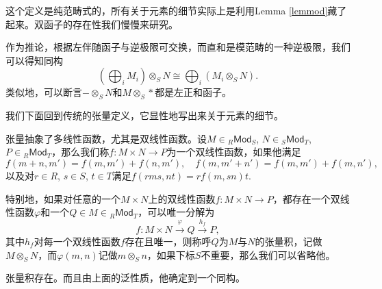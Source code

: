 这个定义是纯范畴式的，所有关于元素的细节实际上是利用Lemma \ref{lemmod}藏了起来。双函子的存在性我们慢慢来研究。


作为推论，根据左伴随函子与逆极限可交换，而直和是模范畴的一种逆极限，我们可以得知同构
\[
	\left(\bigoplus_i M_i\right)\otimes_S N\cong \bigoplus_i \left(M_i\otimes_S N\right).
\]
类似地，可以断言$-\otimes_S N$和$M\otimes_S *$都是左正和函子。

我们下面回到传统的张量定义，它显性地写出来关于元素的细节。

\para 张量抽象了多线性函数，尤其是双线性函数。设$M\in {}_R\mathsf{Mod}_S$, $N\in {}_S\mathsf{Mod}_T$, $P\in {}_R\mathsf{Mod}_T$，那么我们称$f:M\times N\to P$为一个双线性函数，如果他满足
\[
	f(m+n,m')=f(m,m')+f(n,m'),\quad f(m,m'+n')=f(m,m')+f(m,n'),
\]
以及对$r\in R$, $s\in S$, $t\in T$满足$f(rms,nt)=rf(m,sn)t$. 

特别地，如果对任意的一个$M\times N$上的双线性函数$f:M\times N\to P$，都存在一个双线性函数$\varphi$和一个$Q\in M\in {}_R\mathsf{Mod}_T$，可以唯一分解为
\[
	f:M\times N\xrightarrow{\varphi} Q\xrightarrow{h_f}P,
\]
其中$h_f$对每一个双线性函数$f$存在且唯一，则称呼$Q$为$M$与$N$的张量积，记做$M\otimes_S N$，而$\varphi(m,n)$记做$m\otimes_S n$，如果下标$S$不重要，那么我们可以省略他。


\begin{lem}
张量积存在。而且由上面的泛性质，他确定到一个同构。
\end{lem}

